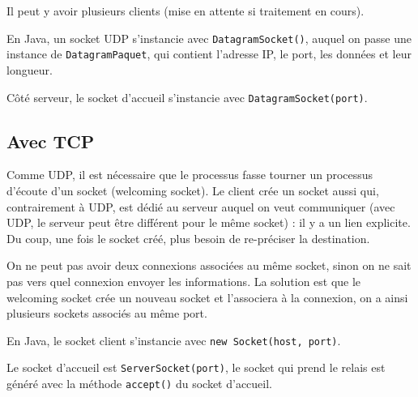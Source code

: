 
	Il peut y avoir plusieurs clients (mise en attente si traitement en cours).
	
	
	En Java, un socket UDP s'instancie avec \texttt{DatagramSocket()}, auquel on passe une instance de \texttt{DatagramPaquet}, qui contient l'adresse IP, le port, les données et leur longueur.
	
	Côté serveur, le socket d'accueil s'instancie avec \texttt{DatagramSocket(port)}.
	
	\subsection{Avec TCP}
	
	Comme UDP, il est nécessaire que le processus fasse tourner un processus d'écoute d'un socket (welcoming socket). Le client crée un socket aussi qui, contrairement à UDP, est dédié au serveur auquel on veut communiquer (avec UDP, le serveur peut être différent pour le même socket) : il y a un lien explicite. Du coup, une fois le socket créé, plus besoin de re-préciser la destination.

	
	On ne peut pas avoir deux connexions associées au même socket, sinon on ne sait pas vers quel connexion envoyer les informations. La solution est que le welcoming socket crée un nouveau socket et l'associera à la connexion, on a ainsi plusieurs sockets associés au même port.
	
	En Java, le socket client s'instancie avec \texttt{new Socket(host, port)}. 
	
	Le socket d'accueil est \texttt{ServerSocket(port)}, le socket qui prend le relais est généré avec la méthode \texttt{accept()} du socket d'accueil.
